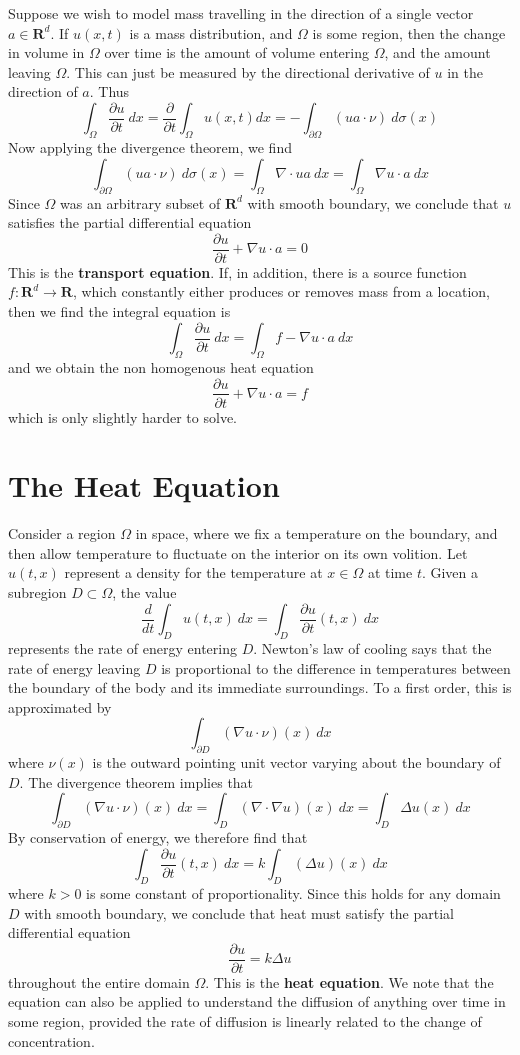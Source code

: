 Suppose we wish to model mass travelling in the direction of a single vector $a \in \mathbf{R}^d$. If $u(x,t)$ is a mass distribution, and $\Omega$ is some region, then the change in volume in $\Omega$ over time is the amount of volume entering $\Omega$, and the amount leaving $\Omega$. This can just be measured by the directional derivative of $u$ in the direction of $a$. Thus
%
\[ \int_\Omega \frac{\partial u}{\partial t}\ dx = \frac{\partial}{\partial t} \int_\Omega u(x,t) dx = - \int_{\partial \Omega} (ua \cdot \nu)\ d\sigma(x) \]
%
Now applying the divergence theorem, we find
%
\[ \int_{\partial \Omega} (ua \cdot \nu)\ d\sigma(x) = \int_\Omega \nabla \cdot ua\  dx = \int_\Omega \nabla u \cdot a\ dx \]
%
Since $\Omega$ was an arbitrary subset of $\mathbf{R}^d$ with smooth boundary, we conclude that $u$ satisfies the partial differential equation
%
\[ \frac{\partial u}{\partial t} + \nabla u \cdot a = 0 \]
%
This is the {\bf transport equation}. If, in addition, there is a source function $f: \mathbf{R}^d \to \mathbf{R}$, which constantly either produces or removes mass from a location, then we find the integral equation is
%
\[ \int_\Omega \frac{\partial u}{\partial t}\ dx = \int_\Omega f - \nabla u \cdot a\ dx \]
%
and we obtain the non homogenous heat equation
%
\[ \frac{\partial u}{\partial t} + \nabla u \cdot a = f \]
%
which is only slightly harder to solve.

\section{The Heat Equation}

Consider a region $\Omega$ in space, where we fix a temperature on the boundary, and then allow temperature to fluctuate on the interior on its own volition. Let $u(t,x)$ represent a density for the temperature at $x \in \Omega$ at time $t$. Given a subregion $D \subset \Omega$, the value
%
\[ \frac{d}{dt} \int_D u(t,x)\ dx = \int_D \frac{\partial u}{\partial t}(t,x)\ dx \]
%
represents the rate of energy entering $D$. Newton's law of cooling says that the rate of energy leaving $D$ is proportional to the difference in temperatures between the boundary of the body and its immediate surroundings. To a first order, this is approximated by
%
\[ \int_{\partial D} (\nabla u \cdot \nu)(x)\ dx \]
%
where $\nu(x)$ is the outward pointing unit vector varying about the boundary of $D$. The divergence theorem implies that
%
\[ \int_{\partial D} (\nabla u \cdot \nu)(x)\ dx = \int_D (\nabla \cdot \nabla u)(x)\ dx = \int_D \Delta u(x)\ dx \]
%
By conservation of energy, we therefore find that
%
\[ \int_D \frac{\partial u}{\partial t}(t,x)\ dx = k \int_D (\Delta u)(x)\ dx \]
%
where $k > 0$ is some constant of proportionality. Since this holds for any domain $D$ with smooth boundary, we conclude that heat must satisfy the partial differential equation
%
\[ \frac{\partial u}{\partial t} = k \Delta u \]
%
throughout the entire domain $\Omega$. This is the {\bf heat equation}. We note that the equation can also be applied to understand the diffusion of anything over time in some region, provided the rate of diffusion is linearly related to the change of concentration.

